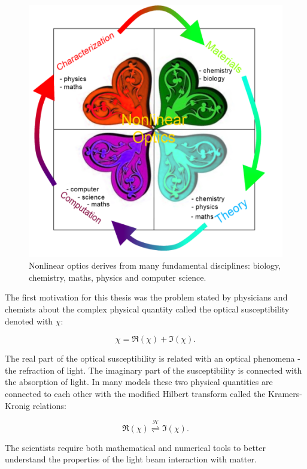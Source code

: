 \documentclass[12pt,twoside,a4paper]{article}
\numberwithin{equation}{subsection}
\numberwithin{figure}{subsection}
\begin{document}
\begin{figure} 
 \includegraphics{img/nlo.png}
 \caption{Nonlinear optics derives from many fundamental disciplines: biology, chemistry, maths, physics and computer science.
 \label{fig:practical_nlo}}
\end{figure}


The first motivation for this thesis was the problem stated by physicians and chemists about the complex physical quantity called the
optical susceptibility denoted with $\chi$:

\begin{equation} \label{eq:pra_susceptibility}
	\chi = \Re (\chi) + \Im (\chi) . 
\end{equation}

The real part of the optical susceptibility is related with an optical phenomena - the refraction of light.
The imaginary part of the susceptibility is connected with the absorption of light. In many models these two physical quantities are connected
to each other with the modified Hilbert transform called the Kramers-Kronig relations:


\begin{equation} \label{eq:pra_hilbert_connection} 
	 \Re (\chi)  \overset{\mathcal{H}}{\rightleftharpoons} \Im (\chi) .
\end{equation}

The scientists require both mathematical and numerical tools to better understand the properties of the light beam interaction with matter. 
\end{document}
